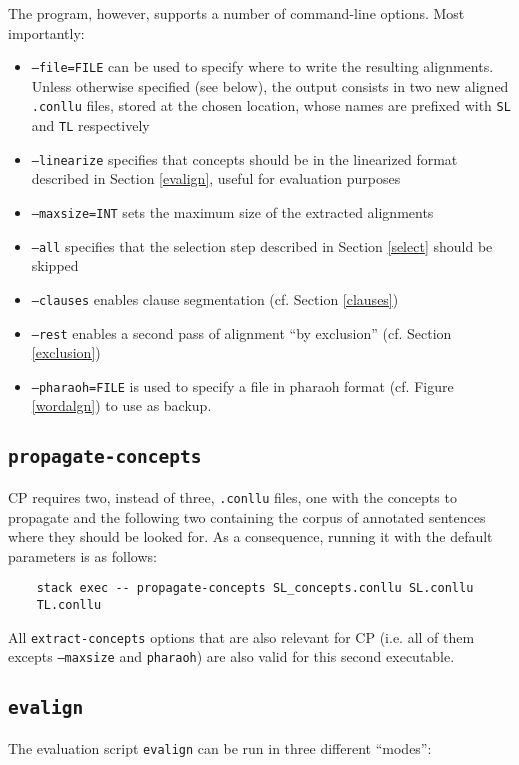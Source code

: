 The program, however, supports a number of command-line options. Most importantly:
\begin{itemize}
    \item \texttt{--file=FILE} can be used to specify where to write the resulting alignments. Unless otherwise specified (see below), the output consists in two new aligned \texttt{.conllu} files, stored at the chosen location, whose names are prefixed with \texttt{SL} and \texttt{TL} respectively
    \item \texttt{--linearize} specifies that concepts should be in the linearized format described in Section \ref{evalign}, useful for evaluation purposes
    \item \texttt{--maxsize=INT} sets the maximum size of the extracted alignments
    \item \texttt{--all} specifies that the selection step described in Section \ref{select} should be skipped
    \item \texttt{--clauses} enables clause segmentation (cf. Section \ref{clauses})
    \item \texttt{--rest} enables a second pass of alignment ``by exclusion'' (cf. Section \ref{exclusion}) 
    \item \texttt{--pharaoh=FILE} is used to specify a file in pharaoh format (cf. Figure \ref{wordalgn}) to use as backup.
\end{itemize}

\subsection{\texttt{propagate-concepts}}
CP requires two, instead of three, \texttt{.conllu} files, one with the concepts to propagate and the following two containing the corpus of annotated sentences where they should be looked for. As a consequence, running it with the default parameters is as follows: \smallskip

\begin{verbatim}
    stack exec -- propagate-concepts SL_concepts.conllu SL.conllu 
    TL.conllu
\end{verbatim} \smallskip

All \texttt{extract-concepts} options that are also relevant for CP (i.e. all of them excepts \texttt{--maxsize} and \texttt{pharaoh}) are also valid for this second executable.

\subsection{\texttt{evalign}}
The evaluation script \texttt{evalign} can be run in three different ``modes'': \smallskip

